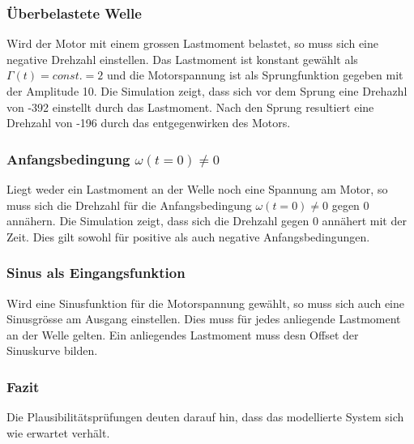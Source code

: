 \subsubsection{Überbelastete Welle}
Wird der Motor mit einem grossen Lastmoment belastet, so muss sich eine
negative Drehzahl einstellen. Das Lastmoment ist konstant gewählt als
$\Gamma(t) = const. = 2$ und die Motorspannung ist als Sprungfunktion
gegeben mit der Amplitude 10. Die Simulation zeigt, dass sich vor dem Sprung
eine Drehazhl von -392 einstellt durch das Lastmoment. Nach den Sprung
resultiert eine Drehzahl von -196 durch das entgegenwirken des Motors.

\subsubsection{Anfangsbedingung $\omega(t=0) \neq 0$}
Liegt weder ein Lastmoment an der Welle noch eine Spannung am Motor, so muss
sich die Drehzahl für die Anfangsbedingung $\omega(t=0) \neq 0$ gegen 0
annähern. Die Simulation zeigt, dass sich die Drehzahl gegen 0 annähert mit
der Zeit. Dies gilt sowohl für positive als auch negative Anfangsbedingungen.

\subsubsection{Sinus als Eingangsfunktion}
Wird eine Sinusfunktion für die Motorspannung gewählt, so muss sich auch
eine Sinusgrösse am Ausgang einstellen. Dies muss für jedes anliegende
Lastmoment an der Welle gelten. Ein anliegendes Lastmoment muss desn Offset
der Sinuskurve bilden.

\subsubsection{Fazit}
Die Plausibilitätsprüfungen deuten darauf hin, dass das modellierte System
sich wie erwartet verhält.
